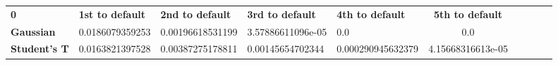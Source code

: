 \begin{tabular}{|l|l|l|l|l|c|c|c|c|c|}
\hline
\textbf{0} & \textbf{1st to default} & \textbf{2nd to default} & \textbf{3rd to default} & \textbf{4th to default} & \textbf{5th to default}\\\hhline{|=|=|=|=|=|=|}
\textbf{Gaussian} & 0.0186079359253 & 0.00196618531199 & 3.57886611096e-05 & 0.0 & 0.0\\
\textbf{Student's T} & 0.0163821397528 & 0.00387275178811 & 0.00145654702344 & 0.000290945632379 & 4.15668316613e-05\\
\hline
\end{tabular}
